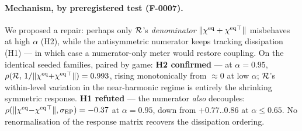 \paragraph{Mechanism, by preregistered test (F-0007).} We proposed a repair:
perhaps only $\mathcal{R}$'s \emph{denominator} $\lVert\chi^{\mathrm{eq}} + \chi^{\mathrm{eq}}{}^\top\rVert$
misbehaves at high $\alpha$ (H2), while the antisymmetric numerator keeps
tracking dissipation (H1) --- in which case a numerator-only meter would
restore coupling. On the identical seeded families, paired by game:
\textbf{H2 confirmed} --- at $\alpha=0.95$,
$\rho(\mathcal{R},\, 1/\lVert\chi^{\mathrm{eq}}{+}\chi^{\mathrm{eq}}{}^\top\rVert) = 0.993$, rising
monotonically from $\approx 0$ at low $\alpha$; $\mathcal{R}$'s within-level variation
in the near-harmonic regime is entirely the shrinking symmetric response.
\textbf{H1 refuted} --- the numerator \emph{also} decouples:
$\rho(\lVert\chi^{\mathrm{eq}}{-}\chi^{\mathrm{eq}}{}^\top\rVert, \sigma_{\mathrm{EP}}) = -0.37$ at $\alpha = 0.95$,
down from $+0.77..0.86$ at $\alpha \le 0.65$. No renormalisation of the
response matrix recovers the dissipation ordering.

